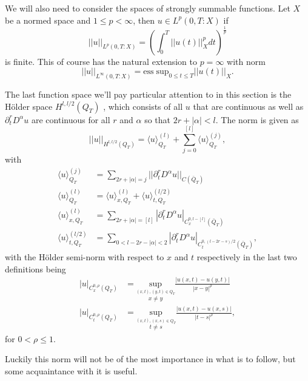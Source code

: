 \documentclass[11pt, a4paper]{article}
\begin{document}
We will also need to consider the spaces of strongly summable functions. Let $X$ be a normed space and $1\leq p < \infty$, then $u \in L^p(0,T:X)$ if
\begin{equation*}
||u||_{L^p(0,T:X)} = \left( \int_0^T ||u(t)||_X^p dt \right)^\frac{1}{p}
\end{equation*} 
is finite. This of course has the natural extension to $p=\infty$ with norm
\begin{equation*}
||u||_{L^\infty(0,T:X)} = \mathrm{ess \; sup}_{0\leq t \leq T} ||u(t)||_X.
\end{equation*}

The last function space we'll pay particular attention to in this section is the Hölder space $H^{l, l/2}(Q_T)$ \citep{ladyzhenskaya}, which consists of all $u$ that are continuous as well as $\partial_t^rD^\alpha u$ are continuous for all $r$ and $\alpha$ so that $2r + |\alpha| <l$. The norm is given as
\begin{equation*}
	||u||_{H^{l,l/2}(Q_T)} = \langle u \rangle^{(l)}_{Q_T} + \sum_{j=0}^{[l]}\langle u \rangle^{(j)}_{Q_T},
\end{equation*}
with
\begin{align*}
\langle u \rangle^{(j)}_{Q_T} &= \sum_{2r+|\alpha|=j} ||\partial_t^r D^\alpha u||_{C(\bar{Q}_T)} \\
\langle u \rangle^{(l)}_{Q_T} &= \langle u \rangle^{(l)}_{x,Q_T} + \langle u \rangle^{(l/2)}_{t,Q_T} \\
\langle u \rangle^{(l)}_{x,Q_T} &= \sum_{2r+|\alpha|=[l]} |\partial_t^r D^{\alpha}u|_{C^{0,l-[l]}_x(\bar{Q}_T)} \\
 \langle u \rangle^{(l/2)}_{t,Q_T} &= \sum_{0 < l - 2r -|\alpha| < 2} |\partial_t^r D^\alpha u|_{C^{0,(l-2r-s)/2}_t(\bar{Q}_T)},
\end{align*}
with the Hölder semi-norm with respect to $x$ and $t$ respectively in the last two definitions being 
\begin{align*}
|u|_{C_x^{0,\rho}(Q_T)} &= \underset{\overset{(x,t),(y,t)\in Q_T}{x\neq y}}{\mathrm{sup}} \frac{|u(x,t) - u(y,t)|}{|x-y|^\rho} \\
|u|_{C_t^{0,\rho}(Q_T)} &= \underset{\overset{(x,t),(x,s)\in Q_T}{t\neq s}}{\mathrm{sup}}\frac{|u(x,t) - u(x,s)|}{|t-s|^\rho},
\end{align*}
for $0 < \rho \leq 1$.

Luckily this norm will not be of the most importance in what is to follow, but some acquaintance with it is useful.

 
 
\end{document}
